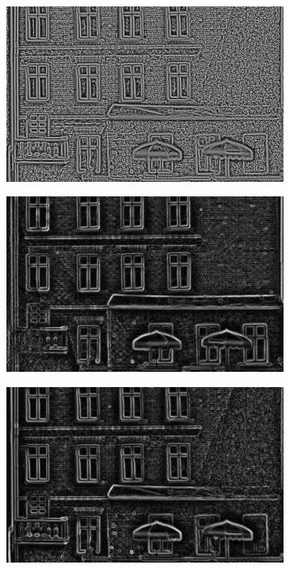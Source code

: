 \documentclass[thesis.tex]{subfiles}
\begin{document}
\begin{figure}[p]
\begin{subfigure}[t]{0.48\textwidth}
        \caption{}
        \label{fig:pixelNormalizationExample5}
    \end{subfigure}
    \begin{subfigure}[t]{0.48\textwidth}
        \includegraphics[width=\textwidth]{img/pixelNormalizationExample6.png}
        \caption{}
        \label{fig:pixelNormalizationExample6}
    \end{subfigure}
    \begin{subfigure}[t]{0.48\textwidth}
        \includegraphics[width=\textwidth]{img/pixelNormalizationExample7.png}
        \caption{}
        \label{fig:pixelNormalizationExample7}
    \end{subfigure}
    \begin{subfigure}[t]{0.48\textwidth}
        \includegraphics[width=\textwidth]{img/pixelNormalizationExample8.png}

\end{subfigure}
\end{figure}
\end{document}
